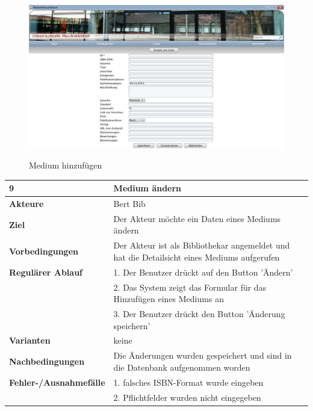 \documentclass[fontsize=12pt,paper=a4,twoside]{scrartcl}
\begin{document}
\begin{figure}[htbp]
\caption{Medium hinzufügen}
\includegraphics[width=1\textwidth]{ScreensWebsite/PublikationHinzufuegen.png}
\label{Medium hinzufuegen}
\end{figure}



\begin{table}[htbp]
\label{9}
\begin{tabular}{|l|p{10cm}|}
\hline 
\textbf{9} & \textbf{Medium ändern} \\ \hline
\textbf{Akteure} & Bert Bib\\ \hline
\textbf{Ziel} & Der Akteur möchte ein Daten eines Mediums ändern \\ \hline
\textbf{Vorbedingungen} & Der Akteur ist als Bibliothekar angemeldet und hat die Detailsicht eines 
Mediums aufgerufen  \\ \hline
\textbf{Regulärer Ablauf} & 
1. Der Benutzer drückt auf den Button 'Ändern' \\
&2. Das System zeigt das Formular für das Hinzufügen eines Mediums an\\
&3. Der Benutzer drückt den Button 'Änderung speichern'\\
\hline
\textbf{Varianten} & 
keine \\ \hline
\textbf{Nachbedingungen} & Die Änderungen wurden gespeichert und sind in die Datenbank 
aufgenommen worden\\ \hline
\textbf{Fehler-/Ausnahmefälle} & 1. falsches ISBN-Format wurde eingeben\\
&2. Pflichtfelder wurden nicht eingegeben\\
\hline
\end{tabular}
\end{table}
\end{document}

